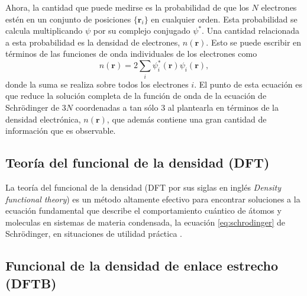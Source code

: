 Ahora, la cantidad que puede medirse es la probabilidad de que los $N$ electrones 
estén en un conjunto de posiciones $\lbrace \mathbf{r}_i \rbrace$ en cualquier orden. 
Esta probabilidad se calcula multiplicando $\psi$ por su complejo conjugado $\psi^*$.
Una cantidad relacionada a esta probabilidad es la densidad de electrones,
$n(\mathbf{r})$. Esto se puede escribir en términos de las funciones de onda 
individuales de los electrones como
\begin{equation}
    n(\mathbf{r}) = 2 \sum_i \psi_i^*(\mathbf{r}) \psi_i(\mathbf{r}),
\end{equation}
donde la suma se realiza sobre todos los electrones $i$. El punto de esta ecuación
es que reduce la solución completa de la función de onda de la ecuación de Schrödinger
de 3$N$ coordenadas a tan sólo 3 al plantearla en términos de la densidad electrónica, 
$n(\mathbf{r})$, que además contiene una gran cantidad de información que es 
observable.

\subsection{Teoría del funcional de la densidad (DFT)}

La teoría del funcional de la densidad (DFT por sus siglas en inglés
\textit{Density functional theory}) es un método altamente efectivo para 
encontrar soluciones a la ecuación fundamental que describe el comportamiento 
cuántico de átomos y moleculas en sistemas de materia condensada, la ecuación 
\ref{eq:schrodinger} de Schrödinger, en situaciones de utilidad práctica 
\cite{sholl2022}.

\subsection{Funcional de la densidad de enlace estrecho (DFTB)}\label{s:dftb}


